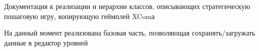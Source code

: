 Документация к реализации и иерархии классов, описывающих стратегическую пошаговую игру, копирующую геймплей X\+Com\textquotesingle{}а

На данный момент реализована базовая часть, позволяющая сохранять/загружать данные в редактор уровней 